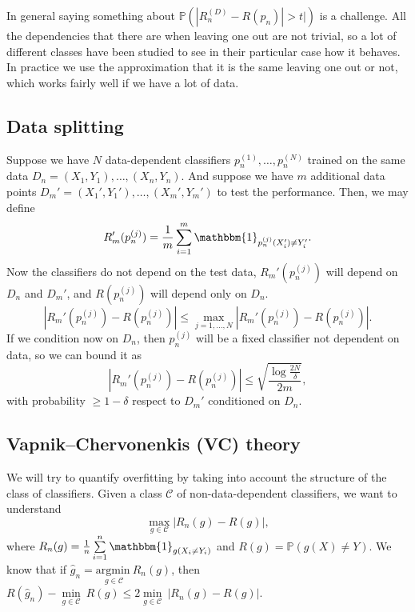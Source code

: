 \documentclass[11pt, english]{article}
\begin{document}
In general saying something about $\mathbb{P}(|R_n^{(D)}-R(p_n)|>t|)$ is a challenge. All the dependencies that there are when leaving one out are not trivial, so a lot of different classes have been studied to see in their particular case how it behaves. In practice we use the approximation that it is the same leaving one out or not, which works fairly well if we have a lot of data. %

\subsection{Data splitting}

Suppose we have $N$ data-dependent classifiers $p_n^{(1)},\dots,p_n^{(N)}$ trained on the same data $D_n=(X_1,Y_1),\dots,(X_n,Y_n)$. And suppose we have $m$ additional data points $D_m'=(X_1',Y_1'),\dots,(X_m',Y_m')$ to test the performance. Then, we may define \begin{equation}
	R_m'(p_n^{(j)})=\frac{1}{m}\sum\limits_{i=1}^m\mathbbm{1}_{p_n^{(j)}(X_i')\neq Y_i'}. %
\end{equation}
Now the classifiers do not depend on the test data, $R_m'(p_n^{(j)})$ will depend on $D_n$ and $D_m'$, and $R(p_n^{(j)})$ will depend only on $D_n$.
\begin{equation}
	|R_m'(p_n^{(j)})-R(p_n^{(j)})|\leq \underset{j=1,\dots,N}{\max}|R_m'(p_n^{(j)})-R(p_n^{(j)})|.
\end{equation}
If we condition now on $D_n$, then $p_n^{(j)}$ will be a fixed classifier not dependent on data, so we can bound it as
\begin{equation}
	|R_m'(p_n^{(j)})-R(p_n^{(j)})|\leq \sqrt{\frac{\log\frac{2N}{\delta}}{2m}},
\end{equation}
with probability $\geq 1-\delta$ respect to $D_m'$ conditioned on $D_n$. \\

\subsection{Vapnik–Chervonenkis (VC) theory}

We will try to quantify overfitting by taking into account the structure of the class of classifiers. Given a class $\mathcal{C}$ of non-data-dependent classifiers, we want to understand 
\begin{equation}
	\underset{g\in\mathcal{C}}{\max}|R_n(g)-R(g)|,
\end{equation}
where $R_n(g)=\frac{1}{n}\sum\limits_{i=1}^n\mathbbm{1}_{g(X_i\neq Y_i)}$ and $R(g)=\mathbb{P}(g(X)\neq Y)$. We know that if $\hat{g}_n=\underset{g\in\mathcal{C}}{\text{argmin}\ }R_n(g)$, then $R(\hat{g}_n)-\underset{g\in\mathcal{C}}{\min}\ R(g)\leq2\underset{g\in\mathcal{C}}{\min}\ |R_n(g)-R(g)|$.\\ %
\end{document}
